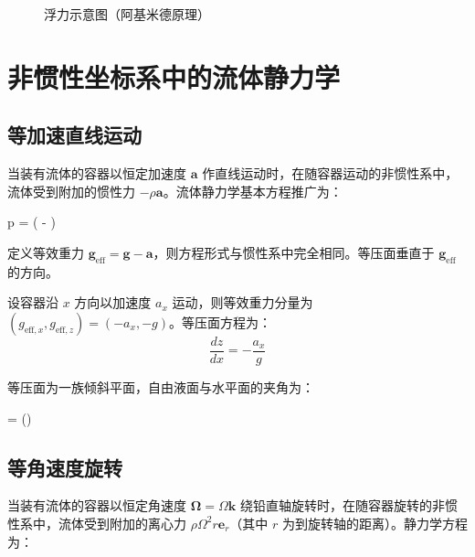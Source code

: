\begin{figure}[H]
\centering
{}
\caption{浮力示意图（阿基米德原理）}
\label{fig:buoyancy}
\end{figure}

\section{非惯性坐标系中的流体静力学}

\subsection{等加速直线运动}

当装有流体的容器以恒定加速度 \(\mathbf{a}\) 作直线运动时，在随容器运动的非惯性系中，流体受到附加的惯性力 \(-\rho \mathbf{a}\)。流体静力学基本方程推广为：

\begin{myformula}
\Nabla p = \rho( - )
\end{myformula}

定义等效重力 \(\mathbf{g}_{\text{eff}} = \mathbf{g} - \mathbf{a}\)，则方程形式与惯性系中完全相同。等压面垂直于 \(\mathbf{g}_{\text{eff}}\) 的方向。

设容器沿 \(x\) 方向以加速度 \(a_x\) 运动，则等效重力分量为 \((g_{\text{eff},x}, g_{\text{eff},z}) = (-a_x, -g)\)。等压面方程为：
\[
\frac{dz}{dx} = -\frac{a_x}{g}
\]

等压面为一族倾斜平面，自由液面与水平面的夹角为：
\begin{myformula}
\theta = \arctan\left(\right)
\end{myformula}

\subsection{等角速度旋转}

当装有流体的容器以恒定角速度 \(\boldsymbol{\Omega} = \Omega\mathbf{k}\) 绕铅直轴旋转时，在随容器旋转的非惯性系中，流体受到附加的离心力 \(\rho\Omega^2 r \mathbf{e}_r\)（其中 \(r\) 为到旋转轴的距离）。静力学方程为：

